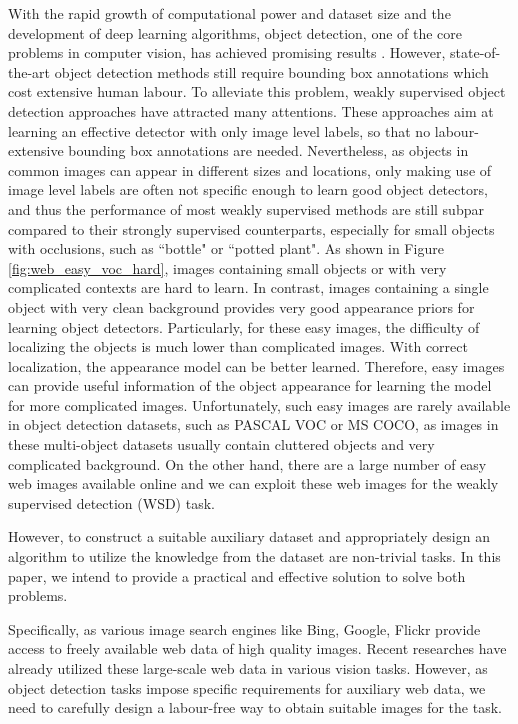 \documentclass[10pt,twocolumn,letterpaper]{article}
\begin{document}
With the rapid growth of computational power and dataset size and the development of deep learning algorithms, object detection, one of the core problems in computer vision, has achieved promising results \cite{ren2015faster,redmon2016you,liu2016ssd,li2016r}. However, state-of-the-art object detection methods still require bounding box annotations which cost extensive human labour. To alleviate this problem, weakly supervised object detection approaches \cite{wang2014weakly,bilen2014weakly,bilen2015weakly,bilen2016weakly,kantorov2016contextlocnet,cinbis2015weakly,tehattention} have attracted many attentions. These approaches aim at learning an effective detector with only image level labels, so that no labour-extensive bounding box annotations are needed. Nevertheless, as objects in common images can appear in different sizes and locations, only making use of image level labels are often not specific enough to learn good object detectors, and thus the performance of most weakly supervised methods are still subpar compared to their strongly supervised counterparts, especially for small objects with occlusions, such as ``bottle" or ``potted plant". As shown in Figure \ref{fig:web_easy_voc_hard}, images containing small objects or with very complicated contexts are hard to learn. In contrast, images containing a single object with very clean background provides very good appearance priors for learning object detectors. Particularly, for these easy images, the difficulty of localizing the objects is much lower than complicated images. With correct localization, the appearance model can be better learned. Therefore, easy images can provide useful information of the object appearance for learning the model for more complicated images. Unfortunately, such easy images are rarely available in object detection datasets, such as PASCAL VOC or MS COCO, as images in these multi-object datasets usually contain cluttered objects and very complicated background. On the other hand, there are a large number of easy web images available online and we can exploit these web images for the weakly supervised detection (WSD) task.

However, to construct a suitable auxiliary dataset and appropriately design an algorithm to utilize the knowledge from the dataset are non-trivial tasks. In this paper, we intend to provide a practical and effective solution to solve both problems.

Specifically, as various image search engines like Bing, Google, Flickr provide access to freely available web data of high quality images. Recent researches \cite{divvala2014learning,chen2015webly,xiao2015learning,xu2015augmenting,krause2016unreasonable} have already utilized these large-scale web data in various vision tasks. However, as object detection tasks impose specific requirements for auxiliary web data, we need to carefully design a labour-free way to obtain suitable images for the task.
\end{document}
